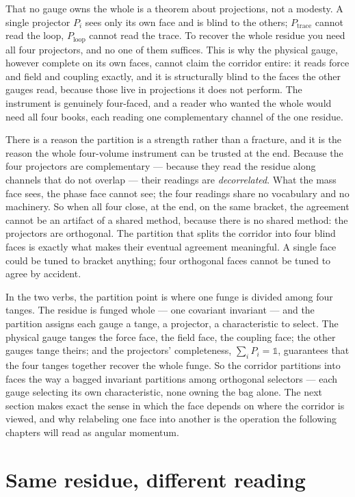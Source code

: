 That no gauge owns the whole is a theorem about projections, not a modesty. A single projector $P_i$ sees only its own face
and is blind to the others; $P_{\text{trace}}$ cannot read the loop, $P_{\text{loop}}$ cannot read the trace. To recover the
whole residue you need all four projectors, and no one of them suffices. This is why the physical gauge, however complete on
its own faces, cannot claim the corridor entire: it reads force and field and coupling exactly, and it is structurally blind
to the faces the other gauges read, because those live in projections it does not perform. The instrument is genuinely
four-faced, and a reader who wanted the whole would need all four books, each reading one complementary channel of the one
residue.

There is a reason the partition is a strength rather than a fracture, and it is the reason the whole four-volume instrument
can be trusted at the end. Because the four projectors are complementary --- because they read the residue along channels
that do not overlap --- their readings are \emph{decorrelated}. What the mass face sees, the phase face cannot see; the four
readings share no vocabulary and no machinery. So when all four close, at the end, on the same bracket, the agreement cannot
be an artifact of a shared method, because there is no shared method: the projectors are orthogonal. The partition that
splits the corridor into four blind faces is exactly what makes their eventual agreement meaningful. A single face could be
tuned to bracket anything; four orthogonal faces cannot be tuned to agree by accident.

In the two verbs, the partition point is where one funge is divided among four tanges. The residue is funged whole --- one
covariant invariant --- and the partition assigns each gauge a tange, a projector, a characteristic to select. The physical
gauge tanges the force face, the field face, the coupling face; the other gauges tange theirs; and the projectors'
completeness, $\sum_i P_i = \mathbb{1}$, guarantees that the four tanges together recover the whole funge. So the corridor
partitions into faces the way a bagged invariant partitions among orthogonal selectors --- each gauge selecting its own
characteristic, none owning the bag alone. The next section makes exact the sense in which the face depends on where the
corridor is viewed, and why relabeling one face into another is the operation the following chapters will read as angular
momentum.

\section{Same residue, different reading}


